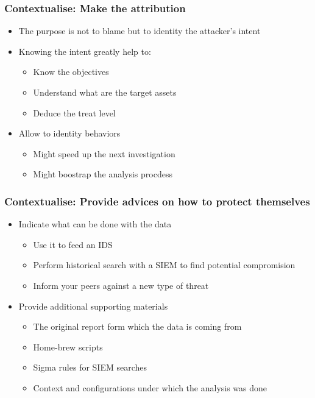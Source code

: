 \begin{frame}
    \frametitle{Contextualise: Make the attribution}
    \begin{itemize}
        \item The purpose is not to blame but to identity the attacker's intent
        \item Knowing the intent greatly help to:
        \begin{itemize}
            \item Know the objectives
            \item Understand what are the target assets
            \item Deduce the treat level
        \end{itemize}
        \item Allow to identity behaviors
        \begin{itemize}
            \item Might speed up the next investigation
            \item Might boostrap the analysis procdess
        \end{itemize}
    \end{itemize}
\end{frame}

\begin{frame}
    \frametitle{Contextualise: Provide advices on how to protect themselves}
    \begin{itemize}
        \item Indicate what can be done with the data
        \begin{itemize}
            \item Use it to feed an IDS
            \item Perform historical search with a SIEM to find potential compromision
            \item Inform your peers against a new type of threat
        \end{itemize}
        \item Provide additional supporting materials
        \begin{itemize}
            \item The original report form which the data is coming from
            \item Home-brew scripts
            \item Sigma rules for SIEM searches
            \item Context and configurations under which the analysis was done
        \end{itemize}
    \end{itemize}
\end{frame}


